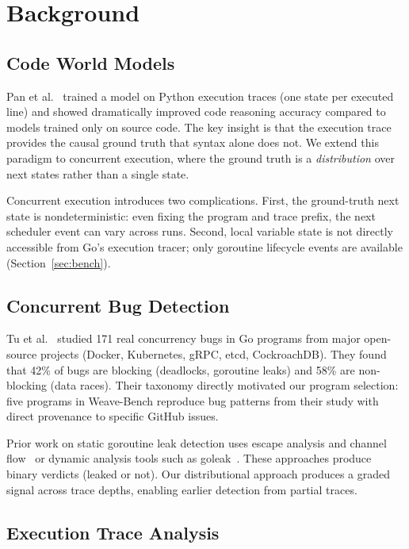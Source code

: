 \documentclass[sigconf,review,anonymous]{acmart}
\begin{document}
\section{Background}

\subsection{Code World Models}

Pan et al.~\cite{meta2025cwm} trained a model on Python execution traces (one
state per executed line) and showed dramatically improved code reasoning accuracy
compared to models trained only on source code. The key insight is that the
execution trace provides the causal ground truth that syntax alone does not. We
extend this paradigm to concurrent execution, where the ground truth is a
\emph{distribution} over next states rather than a single state.

Concurrent execution introduces two complications. First, the ground-truth next
state is nondeterministic: even fixing the program and trace prefix, the next
scheduler event can vary across runs. Second, local variable state is not directly
accessible from Go's execution tracer; only goroutine lifecycle events are
available (Section~\ref{sec:bench}).

\subsection{Concurrent Bug Detection}

Tu et al.~\cite{tu2019understanding} studied 171 real concurrency bugs in Go
programs from major open-source projects (Docker, Kubernetes, gRPC, etcd,
CockroachDB). They found that 42\% of bugs are blocking (deadlocks, goroutine
leaks) and 58\% are non-blocking (data races). Their taxonomy directly motivated
our program selection: five programs in Weave-Bench reproduce bug patterns from
their study with direct provenance to specific GitHub issues.

Prior work on static goroutine leak detection uses escape analysis and channel
flow~\cite{locksmith2006} or dynamic analysis tools such as
goleak~\cite{goleak2019}. These approaches produce binary verdicts (leaked or
not). Our distributional approach produces a graded signal across trace depths,
enabling earlier detection from partial traces.

\subsection{Execution Trace Analysis}
\end{document}
